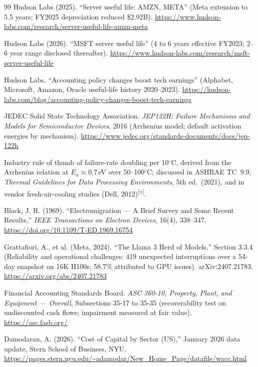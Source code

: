 \documentclass[11pt,letterpaper]{article}
\newcommand{\verify}{\textsuperscript{\textcolor{red}{[v]}}}
\begin{document}
\begin{thebibliography}{99}
Hudson Labs (2025). ``Server useful life: AMZN, META'' (Meta extension to 5.5 years; FY2025 depreciation reduced \$2.92B). \url{https://www.hudson-labs.com/research/server-useful-life-amzn-meta}

Hudson Labs (2026). ``MSFT server useful life'' (4 to 6 years effective FY2023; 2--6 year range disclosed thereafter). \url{https://www.hudson-labs.com/research/msft-server-useful-life}

Hudson Labs. ``Accounting policy changes boost tech earnings'' (Alphabet, Microsoft, Amazon, Oracle useful-life history 2020--2023). \url{https://hudson-labs.com/blog/accounting-policy-changes-boost-tech-earnings}

JEDEC Solid State Technology Association. \textit{JEP122H: Failure Mechanisms and Models for Semiconductor Devices}, 2016 (Arrhenius model; default activation energies by mechanism). \url{https://www.jedec.org/standards-documents/docs/jep-122h}

Industry rule of thumb of failure-rate doubling per 10$^{\circ}$C, derived from the Arrhenius relation at $E_a\approx0.7$\,eV over 50--100$^{\circ}$C; discussed in ASHRAE TC~9.9, \textit{Thermal Guidelines for Data Processing Environments}, 5th ed.\ (2021), and in vendor fresh-air-cooling studies (Dell, 2012)\verify.

Black, J. R. (1969). ``Electromigration --- A Brief Survey and Some Recent Results,'' \textit{IEEE Transactions on Electron Devices}, 16(4), 338--347. \url{https://doi.org/10.1109/T-ED.1969.16754}

Grattafiori, A., et al. (Meta, 2024). ``The Llama 3 Herd of Models,'' Section 3.3.4 (Reliability and operational challenges: 419 unexpected interruptions over a 54-day snapshot on 16K H100s; 58.7\% attributed to GPU issues). arXiv:2407.21783. \url{https://arxiv.org/abs/2407.21783}

Financial Accounting Standards Board. \textit{ASC 360-10, Property, Plant, and Equipment --- Overall}, Subsections 35-17 to 35-35 (recoverability test on undiscounted cash flows; impairment measured at fair value). \url{https://asc.fasb.org/}

Damodaran, A. (2026). ``Cost of Capital by Sector (US),'' January 2026 data update, Stern School of Business, NYU. \url{https://pages.stern.nyu.edu/~adamodar/New_Home_Page/datafile/wacc.html}


\end{thebibliography}
\end{document}

